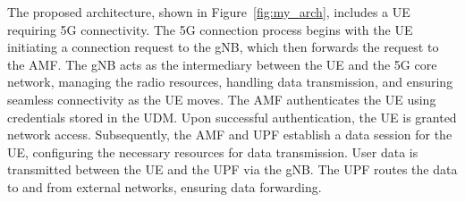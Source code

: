 The proposed architecture, shown in Figure~\ref{fig:my_arch}, includes a UE requiring 5G connectivity.
The 5G connection process begins with the UE initiating a connection request to the gNB, which then forwards the request to the AMF\@.
The gNB acts as the intermediary between the UE and the 5G core network, managing the radio resources, handling data transmission, and ensuring seamless connectivity as the UE moves.
The AMF authenticates the UE using credentials stored in the UDM. Upon successful authentication, the UE is granted  network access.
Subsequently, the AMF and UPF establish a data session for the UE, configuring the necessary resources for data transmission.
User data is transmitted between the UE and the UPF via the gNB\@.
The UPF routes the data to and from external networks, ensuring data forwarding.




